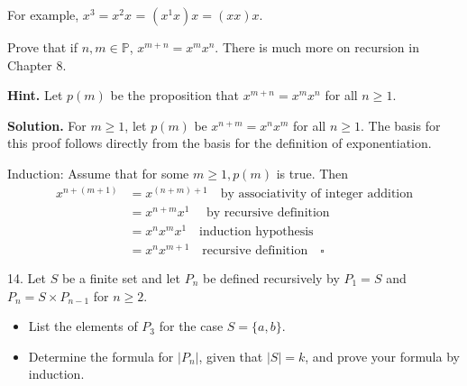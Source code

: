 \documentclass[10pt,]{book}
\theoremstyle{plain}
\theoremstyle{definition}
\theoremstyle{definition}
\theoremstyle{definition}
\theoremstyle{definition}
\begin{document}
\begin{exercisegroup}
For example, \(x^3= x^2x\) = \((x^1x)x = (x x) x\).    %
\par
 Prove that
if \(n, m \in  \mathbb{P}\), \(x^{m+n}= x^mx^n\).  There is much more on recursion in Chapter 8.%
\par\smallskip
\par\smallskip
\noindent\textbf{Hint.}\hypertarget{hint-2}{}\quad
 Let \(p(m)\) be the proposition that \(x^{m+n}= x^mx^n\) for all \(n\geq 1\).%
\par\smallskip
\noindent\textbf{Solution.}\hypertarget{solution-6}{}\quad
 For \(m\geqslant 1\), let \(p(m)\textrm{ be } x^{n+m}=x^nx^m\) for all \(n\geqslant 1\). The basis for this proof follows directly from the basis for the definition of exponentiation.%
\par
Induction: Assume that for some \(m\geqslant 1, p(m)\) is true. Then
\begin{equation*}
\begin{split}
x^{n+(m+1)} & =x^{(n+m)+1}\quad \textrm{by associativity of integer addition}\\
	&=x^{n+m}x^1 \quad \textrm{  by recursive definition}\\
	&=x^nx^mx^1 \quad \textrm{induction hypothesis}\\
	&=x^nx^{m+1}\quad \textrm{recursive definition}\quad \square
\end{split}
\end{equation*}%
\item[14.]\hypertarget{exercise-51}{} Let \(S\) be a finite set and let \(P_n\) be defined recursively by \(P_{1 } = S\)  and \(P_n= S\times P_{n-1}\) for \(n\geq 2\).
\leavevmode%
\begin{itemize}[label=\textbullet]
\item{}List the elements of \(P_3\) for the case \(S = \{a, b\}\).%
\item{}Determine the formula for \(\lvert P_n \rvert\), given that \(\lvert S \rvert= k\), and prove your formula by induction.%
\end{itemize}

%
\par\smallskip
\end{exercisegroup}
\par\smallskip\noindent
\typeout{************************************************}
\typeout{************************************************}
\end{document}
